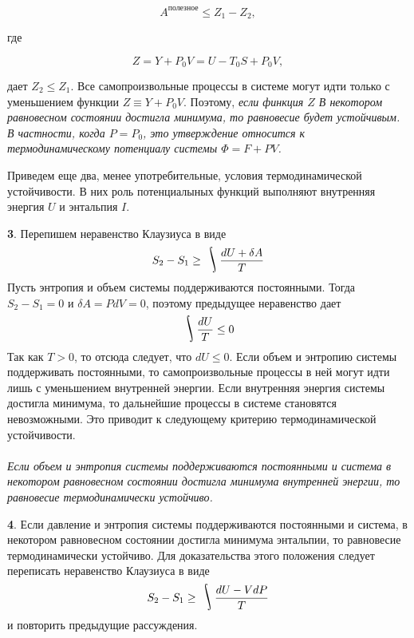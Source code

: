 \documentclass[a4paper,14pt]{article} %
\DeclareMathOperator*{\myint}{\ThisStyle{\rotatebox{25}{$\SavedStyle\!\int\!\!\!$}}}
\begin{document}
\begin{equation*}
A^{\text {полезное}} \leqslant Z_{1}-Z_{2},
\end{equation*}

где 

\begin{equation*}
Z=Y+P_{0} V=U-T_{0} S+P_{0} V,
\end{equation*}

 дает $Z_{2} \leqslant Z_{1} .$ Все самопроизвольные процессы в системе могут идти только с уменьшением функции $Z \equiv Y+P_{0} V .$ Поэтому, \textit{если финкция $Z$ В некотором равновесном состоянии достигла минимума, то равновесие будет устойчивым. В частности, когда $P = P_0$,  это утверждение относится к термодинамическому потенциалу системы $\Phi = F+ P V$.}
 
Приведем еще два, менее употребительные, условия термодинамической устойчивости. В них роль потенциалыных функций выполняют внутренняя энергия $U$ и энтальпия $I$.

\textbf{3}. Перепишем неравенство Клаузиуса в виде
\[S_2 - S_1 \geq \myint{\frac{dU + \delta A}{T}}\]
Пусть энтропия и объем системы поддерживаются постоянными. Тогда $S_2 - S_1 = 0$ и $\delta A = PdV = 0$, поэтому предыдущее неравенство дает 
\[\myint{\frac{dU}{T}} \leq 0\]
Так как $T > 0$, то отсюда следует, что $dU \leq 0$. Если объем и
энтропию системы поддерживать постоянными, то самопроизвольные процессы в ней могут идти лишь с уменьшением внутренней
энергии. Если внутренняя энергия системы достигла минимума, то
дальнейшие процессы в системе становятся невозможными. Это
приводит к следующему критерию термодинамической устойчивости.\\\\
\textit{Если объем и энтропия системы поддерживаются постоянными
и система в некотором равновесном состоянии достигла минимума
внутренней энергии, то равновесие термодинамически устойчиво.} 

\textbf{4}. Если давление и энтропия системы поддерживаются постоянными и система, в некотором равновесном состоянии достигла минимума энтальпии, то равновесие термодинамически устойчиво.
Для доказательства этого положения следует переписать неравенство Клаузиуса в виде 
\[S_2 - S_1 \geq \myint{\frac{dU - VdP}{T}}\]
и повторить предыдущие рассуждения.
\end{document}
